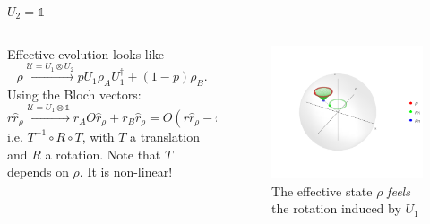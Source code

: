 \documentclass{cubeamer}
\newcommand{\mcU}{\mathcal{U}}
\newcommand{\Id}{\mathds{1}}%
\begin{document}
\begin{frame}{$U_{2}=\Id$}
\begin{columns}
    \begin{column}{0.5\textwidth}
        Effective evolution looks like
        \begin{equation*}
            \rho\xrightarrow{\mcU=U_{1}\otimes U_{2}} pU_{1}\rho_{A}U_{1}^{\dag}+(1-p)\rho_{B}.
        \end{equation*}
        Using the Bloch vectors:
        \begin{equation*}
            r\hat{r}_{\rho}\xrightarrow{\mcU=U_{1}\otimes \Id}r_{A}O\hat{r}_{\rho}+r_{B}\hat{r}_{\rho}=O(r\hat{r}_{\rho}-r_{B}\hat{r}_{\rho})+r_{B}\hat{r}_{\rho}
        \end{equation*}
        i.e. $T^{-1}\circ R\circ T$, with $T$ a translation and $R$ a rotation. Note that $T$ depends on $\rho$. It is non-linear!
    \end{column}
    \begin{column}{0.5\textwidth}
        \begin{figure}[h!]
            \includegraphics[width=0.8\linewidth]{../notes/log/maxent/figures/U1xU2_H1=sz_H2=Id_z=0.9_p=0.4_sequence.png}
            \caption{The effective state $\rho$ \textit{feels} the rotation induced by $U_{1}$}
            \label{fig:ZRot}
        \end{figure}
    \end{column}
\end{columns}
\end{frame}
\end{document}
